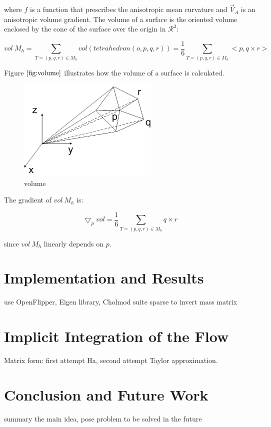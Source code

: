 \documentclass[11pt]{article}
\begin{document}
where $f$ is a function that prescribes the anisotropic mean curvature and $\vec{V}_A$ is an anisotropic volume gradient. The volume of a surface is the oriented volume enclosed by the cone of the surface over the origin in $\mathcal{R}^3$:

\begin{equation}
vol \ M_h = \sum\limits_{T=(p, q, r) \in M_h}vol(tetrahedron(o, p, q, r)) = \frac{1}{6}\sum\limits_{T=(p, q, r) \in M_h}<p, q \times r>
\end{equation}

Figure $\ref{fig:volume}$ illustrates how the volume of a surface is calculated.

\begin{figure}[htb]
\centering
\includegraphics[width=0.6\textwidth]{volume.png}
\caption{volume}
\label{fig:volume}
\end{figure}

The gradient of $vol \ M_h$ is:

\begin{equation}
\bigtriangledown_p vol = \frac{1}{6}\sum\limits_{T=(p, q, r) \in M_h}q \times r
\end{equation}

since $vol \ M_h$ linearly depends on $p$.

\section{Implementation and Results}

use OpenFlipper, Eigen library, Cholmod suite sparse to invert mass matrix

\section{Implicit Integration of the Flow}

Matrix form: first attempt Ha, second attempt Taylor approximation.

\section{Conclusion and Future Work}

summary the main idea, pose problem to be solved in the future

\end{document}
